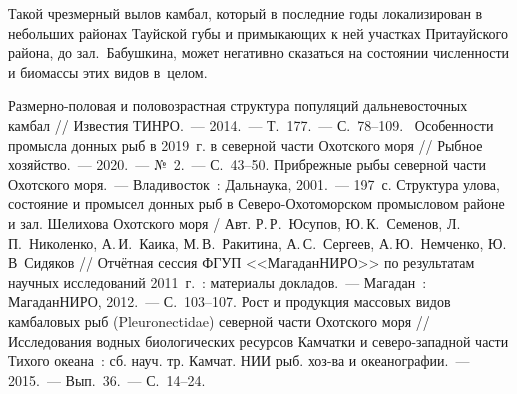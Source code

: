 Такой чрезмерный вылов камбал, который в последние годы локализирован в небольших районах Тауйской губы и примыкающих к ней участках Притауйского района, до зал.~Бабушкина, может негативно сказаться на состоянии численности и биомассы этих видов в~целом.


\begin{thebibliography}{99}

\bibitem{}
 Размерно-половая и половозрастная структура популяций дальневосточных камбал // Известия ТИНРО.~--- 2014.~--- Т.~177.~--- С.~78--109.
\bibitem{}
 Особенности промысла донных рыб в 2019~г. в северной части Охотского моря // Рыбное хозяйство.~--- 2020.~--- №~2.~--- С.~43--50.
\bibitem{}
 Прибрежные рыбы северной части Охотского моря.~--- Владивосток~: Дальнаука, 2001.~--- 197~с.
\bibitem{}
 Структура улова, состояние и промысел донных рыб в Северо-Охотоморском промысловом районе и зал. Шелихова Охотского моря / Авт. Р.\,Р.~Юсупов, Ю.\,К.~Семенов, Л.\,П.~Николенко, А.\,И.~Каика, М.\,В.~Ракитина, А.\,С.~Сергеев, А.\,Ю.~Немченко, Ю.\,В~Сидяков  // Отчётная сессия ФГУП <<МагаданНИРО>> по результатам научных исследований 2011~г.~: материалы докладов.~--- Магадан~: МагаданНИРО, 2012.~--- С.~103--107.
\bibitem{}
 Рост и продукция массовых видов камбаловых рыб (Pleuronectidae) северной части Охотского моря // Исследования водных биологических ресурсов Камчатки и северо-западной части Тихого океана~: сб. науч. тр. Камчат. НИИ рыб. хоз-ва и океанографии.~--- 2015.~--- Вып.~36.~--- С.~14--24.
\end{thebibliography}
